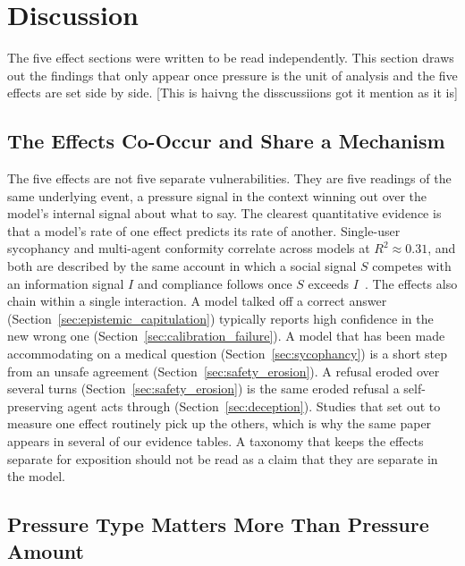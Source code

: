 \section{Discussion}
\label{sec:discussion}

The five effect sections were written to be read independently. This section draws out the findings that only appear once pressure is the unit of analysis and the five effects are set side by side. [This is haivng the disscussiions got it mention as it is]

\subsection{The Effects Co-Occur and Share a Mechanism}

The five effects are not five separate vulnerabilities. They are five readings of the same underlying event, a pressure signal in the context winning out over the model's internal signal about what to say. The clearest quantitative evidence is that a model's rate of one effect predicts its rate of another. Single-user sycophancy and multi-agent conformity correlate across models at $R^2 \approx 0.31$, and both are described by the same account in which a social signal $S$ competes with an information signal $I$ and compliance follows once $S$ exceeds $I$~\citep{HumanLikeSocialCompliance_Zhang}. The effects also chain within a single interaction. A model talked off a correct answer (Section~\ref{sec:epistemic_capitulation}) typically reports high confidence in the new wrong one (Section~\ref{sec:calibration_failure}). A model that has been made accommodating on a medical question (Section~\ref{sec:sycophancy}) is a short step from an unsafe agreement (Section~\ref{sec:safety_erosion}). A refusal eroded over several turns (Section~\ref{sec:safety_erosion}) is the same eroded refusal a self-preserving agent acts through (Section~\ref{sec:deception}). Studies that set out to measure one effect routinely pick up the others, which is why the same paper appears in several of our evidence tables. A taxonomy that keeps the effects separate for exposition should not be read as a claim that they are separate in the model.

\subsection{Pressure Type Matters More Than Pressure Amount}

